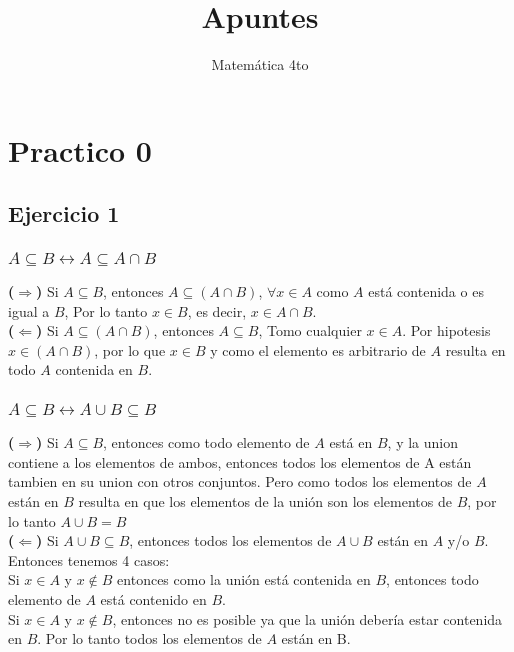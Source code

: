 \documentclass[a4paper]{article}
\title{Apuntes}
\author{Matemática 4to}
\begin{document}
\maketitle
\section{Practico 0}
\subsection{Ejercicio 1}
\subsubsection{$A \subseteq B \leftrightarrow A \subseteq A\cap B$}
\textbf{($\Rightarrow$)} Si $A \subseteq B$, entonces $A\subseteq(A\cap B)$, $\forall x \in A$ como $A$ está contenida o es igual a $B$, Por lo tanto $x \in B$, es decir, $x \in A\cap B$.\\
\textbf{($\Leftarrow$)} Si $A \subseteq (A\cap B)$, entonces $A \subseteq B$, Tomo cualquier $x \in A$. Por hipotesis $x \in (A\cap B)$, por lo que $x \in B$ y como el elemento es arbitrario de $A$ resulta en todo $A$ contenida en $B$.

\subsubsection{$A \subseteq B \leftrightarrow A\cup B \subseteq B$}
\textbf{($\Rightarrow$)} Si $A \subseteq B$, entonces como todo elemento de $A$ está en $B$, y la union contiene a los elementos de ambos, entonces todos los elementos de A están tambien en su union con otros conjuntos. Pero como todos los elementos de $A$ están en $B$ resulta en que los elementos de la unión son los elementos de $B$, por lo tanto $A\cup B = B$\\
\textbf{($\Leftarrow$)} Si $A\cup B \subseteq B$, entonces todos los elementos de $A\cup B$ están en $A$ y/o $B$. Entonces tenemos 4 casos:\\
Si $x \in A$ y $x \notin B$ entonces como la unión está contenida en $B$, entonces todo elemento de $A$ está contenido en $B$.\\
Si $x \in A$ y $x\notin B$, entonces no es posible ya que la unión debería estar contenida en $B$. Por lo tanto todos los elementos de $A$ están en B.
\end{document}
